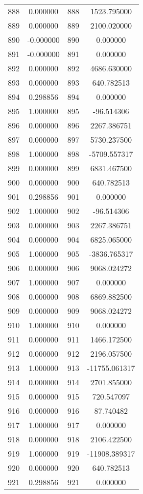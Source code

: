 \documentclass[12pt]{article}
\begin{document}
\begin{longtable}{@{}cccc@{}}
888 & 0.000000 & 888 & 1523.795000 \\
889 & 0.000000 & 889 & 2100.020000 \\
890 & -0.000000 & 890 & 0.000000 \\
891 & -0.000000 & 891 & 0.000000 \\
892 & 0.000000 & 892 & 4686.630000 \\
893 & 0.000000 & 893 & 640.782513 \\
894 & 0.298856 & 894 & 0.000000 \\
895 & 1.000000 & 895 & -96.514306 \\
896 & 0.000000 & 896 & 2267.386751 \\
897 & 0.000000 & 897 & 5730.237500 \\
898 & 1.000000 & 898 & -5709.557317 \\
899 & 0.000000 & 899 & 6831.467500 \\
900 & 0.000000 & 900 & 640.782513 \\
901 & 0.298856 & 901 & 0.000000 \\
902 & 1.000000 & 902 & -96.514306 \\
903 & 0.000000 & 903 & 2267.386751 \\
904 & 0.000000 & 904 & 6825.065000 \\
905 & 1.000000 & 905 & -3836.765317 \\
906 & 0.000000 & 906 & 9068.024272 \\
907 & 1.000000 & 907 & 0.000000 \\
908 & 0.000000 & 908 & 6869.882500 \\
909 & 0.000000 & 909 & 9068.024272 \\
910 & 1.000000 & 910 & 0.000000 \\
911 & 0.000000 & 911 & 1466.172500 \\
912 & 0.000000 & 912 & 2196.057500 \\
913 & 1.000000 & 913 & -11755.061317 \\
914 & 0.000000 & 914 & 2701.855000 \\
915 & 0.000000 & 915 & 720.547097 \\
916 & 0.000000 & 916 & 87.740482 \\
917 & 1.000000 & 917 & 0.000000 \\
918 & 0.000000 & 918 & 2106.422500 \\
919 & 1.000000 & 919 & -11908.389317 \\
920 & 0.000000 & 920 & 640.782513 \\
921 & 0.298856 & 921 & 0.000000 \\

\end{longtable}
\end{document}
